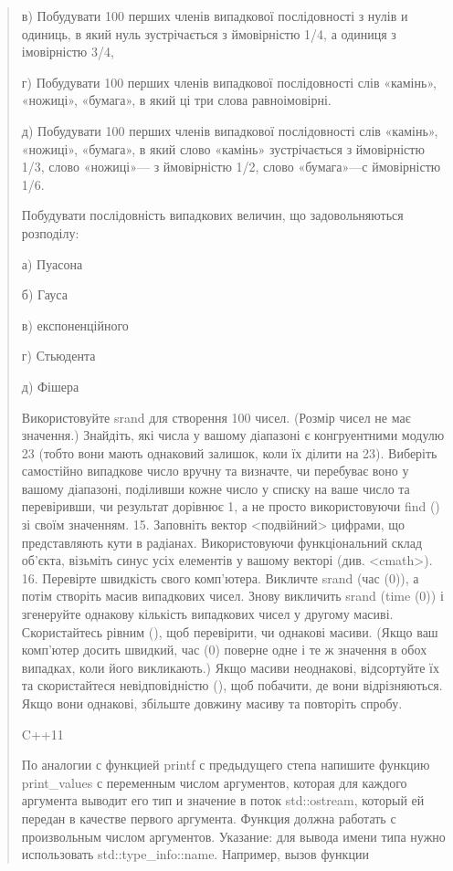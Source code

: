 \documentclass[]{article}
\begin{document}
\begin{quote}
в) Побудувати 100 перших членів випадкової послідовності з нулів и
одиниць, в який нуль зустрічається з ймовірністю 1/4, а одиниця з
імовірністю 3/4,

г) Побудувати 100 перших членів випадкової послідовності слів «камінь»,
«ножиці», «бумага», в який ці три слова равноімовірні.

д) Побудувати 100 перших членів випадкової послідовності слів «камінь»,
«ножиці», «бумага», в який слово «камінь» зустрічається з ймовірністю
1/3, слово «ножиці»--- з ймовірністю 1/2, слово «бумага»---с ймовірністю
1/6.

Побудувати послідовність випадкових величин, що задовольняються
розподілу:

а) Пуасона

б) Гауса

в) експоненційного

г) Стьюдента

д) Фішера

Використовуйте srand для створення 100 чисел. (Розмір чисел не має
значення.) Знайдіть, які числа у вашому діапазоні є конгруентними модулю
23 (тобто вони мають однаковий залишок, коли їх ділити на 23). Виберіть
самостійно випадкове число вручну та визначте, чи перебуває воно у
вашому діапазоні, поділивши кожне число у списку на ваше число та
перевіривши, чи результат дорівнює 1, а не просто використовуючи find ()
зі своїм значенням. 15. Заповніть вектор
\textless{}подвійний\textgreater{} цифрами, що представляють кути в
радіанах. Використовуючи функціональний склад об'єкта, візьміть синус
усіх елементів у вашому векторі (див. \textless{}cmath\textgreater{}).
16. Перевірте швидкість свого комп'ютера. Викличте srand (час (0)), а
потім створіть масив випадкових чисел. Знову викличить srand (time (0))
і згенеруйте однакову кількість випадкових чисел у другому масиві.
Скористайтесь рівним (), щоб перевірити, чи однакові масиви. (Якщо ваш
комп'ютер досить швидкий, час (0) поверне одне і те ж значення в обох
випадках, коли його викликають.) Якщо масиви неоднакові, відсортуйте їх
та скористайтеся невідповідністю (), щоб побачити, де вони
відрізняються. Якщо вони однакові, збільште довжину масиву та повторіть
спробу.


C++11



По аналогии с функцией printf с предыдущего степа напишите функцию print_values с переменным числом аргументов, которая для каждого аргумента выводит его тип и значение в поток std::ostream, который ей передан в качестве первого аргумента. Функция должна работать с произвольным числом аргументов.
Указание: для вывода имени типа нужно использовать std::type_info::name.
Например, вызов функции


\end{quote}
\end{document}
